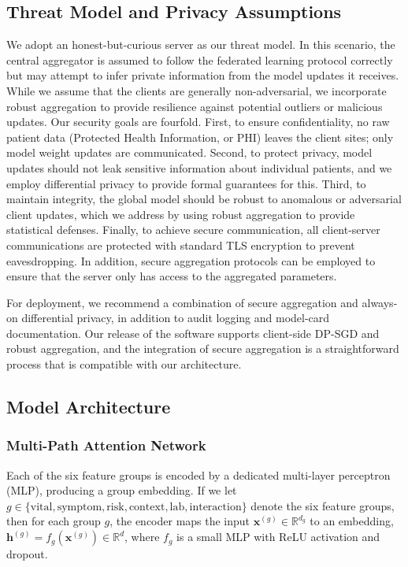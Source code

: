 \documentclass[journal,article,submit,pdftex,moreauthors]{Definitions/mdpi}
\begin{document}
\subsection{Threat Model and Privacy Assumptions}\label{sec:threat_model}

We adopt an honest-but-curious server as our threat model. In this scenario, the central aggregator is assumed to follow the federated learning protocol correctly but may attempt to infer private information from the model updates it receives. While we assume that the clients are generally non-adversarial, we incorporate robust aggregation to provide resilience against potential outliers or malicious updates. Our security goals are fourfold. First, to ensure confidentiality, no raw patient data (Protected Health Information, or PHI) leaves the client sites; only model weight updates are communicated. Second, to protect privacy, model updates should not leak sensitive information about individual patients, and we employ differential privacy to provide formal guarantees for this. Third, to maintain integrity, the global model should be robust to anomalous or adversarial client updates, which we address by using robust aggregation to provide statistical defenses. Finally, to achieve secure communication, all client-server communications are protected with standard TLS encryption to prevent eavesdropping. In addition, secure aggregation protocols can be employed to ensure that the server only has access to the aggregated parameters.

For deployment, we recommend a combination of secure aggregation and always-on differential privacy, in addition to audit logging and model-card documentation. Our release of the software supports client-side DP-SGD and robust aggregation, and the integration of secure aggregation is a straightforward process that is compatible with our architecture.

\subsection{Model Architecture}\label{sec:architecture}

\subsubsection{Multi-Path Attention Network}

Each of the six feature groups is encoded by a dedicated multi-layer perceptron (MLP), producing a group embedding. If we let $g \in \{\text{vital}, \text{symptom}, \text{risk}, \text{context}, \text{lab}, \text{interaction}\}$ denote the six feature groups, then for each group $g$, the encoder maps the input $\mathbf{x}^{(g)} \in \mathbb{R}^{d_g}$ to an embedding, $\mathbf{h}^{(g)} = f_g(\mathbf{x}^{(g)}) \in \mathbb{R}^{d}$, where $f_g$ is a small MLP with ReLU activation and dropout.
\end{document}
